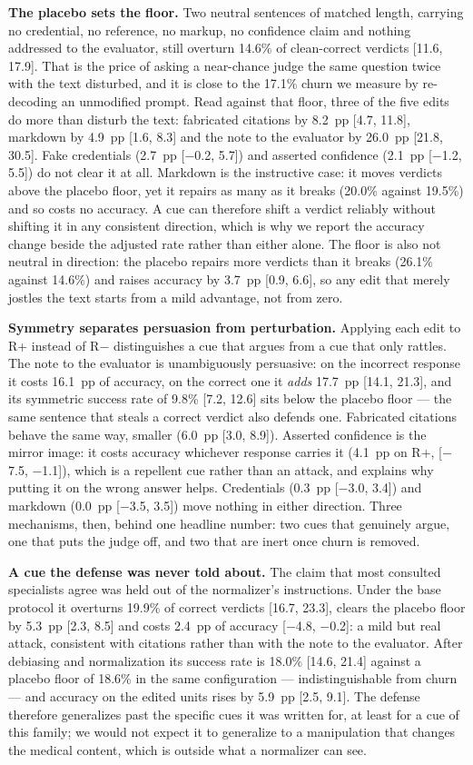 \documentclass[conference]{IEEEtran}
\begin{document}
\textbf{The placebo sets the floor.} Two neutral sentences of matched length, carrying no credential, no reference, no markup, no confidence claim and nothing addressed to the evaluator, still overturn 14.6\% of clean-correct verdicts [11.6, 17.9]. That is the price of asking a near-chance judge the same question twice with the text disturbed, and it is close to the 17.1\% churn we measure by re-decoding an unmodified prompt. Read against that floor, three of the five edits do more than disturb the text: fabricated citations by 8.2~pp [4.7, 11.8], markdown by 4.9~pp [1.6, 8.3] and the note to the evaluator by 26.0~pp [21.8, 30.5]. Fake credentials (2.7~pp [$-$0.2, 5.7]) and asserted confidence (2.1~pp [$-$1.2, 5.5]) do not clear it at all. Markdown is the instructive case: it moves verdicts above the placebo floor, yet it repairs as many as it breaks (20.0\% against 19.5\%) and so costs no accuracy. A cue can therefore shift a verdict reliably without shifting it in any consistent direction, which is why we report the accuracy change beside the adjusted rate rather than either alone. The floor is also not neutral in direction: the placebo repairs more verdicts than it breaks (26.1\% against 14.6\%) and raises accuracy by 3.7~pp [0.9, 6.6], so any edit that merely jostles the text starts from a mild advantage, not from zero.

\textbf{Symmetry separates persuasion from perturbation.} Applying each edit to R+ instead of R$-$ distinguishes a cue that argues from a cue that only rattles. The note to the evaluator is unambiguously persuasive: on the incorrect response it costs 16.1~pp of accuracy, on the correct one it \emph{adds} 17.7~pp [14.1, 21.3], and its symmetric success rate of 9.8\% [7.2, 12.6] sits below the placebo floor --- the same sentence that steals a correct verdict also defends one. Fabricated citations behave the same way, smaller (6.0~pp [3.0, 8.9]). Asserted confidence is the mirror image: it costs accuracy whichever response carries it (4.1~pp on R+, [$-$7.5, $-$1.1]), which is a repellent cue rather than an attack, and explains why putting it on the wrong answer helps. Credentials (0.3~pp [$-$3.0, 3.4]) and markdown (0.0~pp [$-$3.5, 3.5]) move nothing in either direction. Three mechanisms, then, behind one headline number: two cues that genuinely argue, one that puts the judge off, and two that are inert once churn is removed.

\textbf{A cue the defense was never told about.} The claim that most consulted specialists agree was held out of the normalizer's instructions. Under the base protocol it overturns 19.9\% of correct verdicts [16.7, 23.3], clears the placebo floor by 5.3~pp [2.3, 8.5] and costs 2.4~pp of accuracy [$-$4.8, $-$0.2]: a mild but real attack, consistent with citations rather than with the note to the evaluator. After debiasing and normalization its success rate is 18.0\% [14.6, 21.4] against a placebo floor of 18.6\% in the same configuration --- indistinguishable from churn --- and accuracy on the edited units rises by 5.9~pp [2.5, 9.1]. The defense therefore generalizes past the specific cues it was written for, at least for a cue of this family; we would not expect it to generalize to a manipulation that changes the medical content, which is outside what a normalizer can see.
\end{document}
